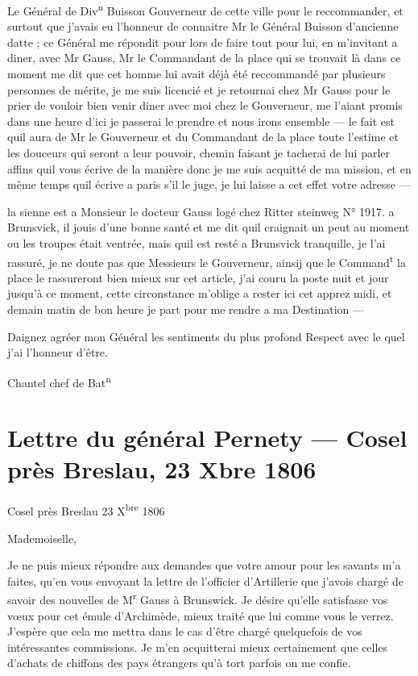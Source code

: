 \documentclass[11pt,a4paper]{article}
\begin{document}
Le Général de Div\textsuperscript{n} Buisson Gouverneur de cette ville pour le
reccommander, et surtout que j'avais eu l'honneur de connaitre Mr le Général
Buisson d'ancienne datte ; ce Général me répondit pour lors de faire tout pour
lui, en m'invitant a diner, avec Mr Gauss, Mr le Commandant de la place qui se
trouvait là dans ce moment me dit que cet homme lui avait déjà été
reccommandé par plusieurs personnes de mérite, je me suis licencié et je
retournai chez Mr Gauss pour le prier de vouloir bien venir diner avec moi chez
le Gouverneur, me l'aiant promis dans une heure d'ici je passerai le prendre et
nous irons ensemble — le fait est quil aura de Mr le Gouverneur et du
Commandant de la place toute l'estime et les douceurs qui seront a leur
pouvoir, chemin faisant je tacherai de lui parler affins quil vous écrive de la
manière donc je me suis acquitté de ma mission, et en même temps quil écrive a
paris s'il le juge, je lui laisse a cet effet votre adresse —

la sienne est a Monsieur le docteur Gauss logé chez Ritter steinweg N° 1917. a
Brunsvick, il jouis d'une bonne santé et me dit quil craignait un peut au
moment ou les troupes était ventrée, mais quil est resté a Brunsvick
tranquille, je l'ai rassuré,  je ne doute pas que Messieurs
le Gouverneur, ainsij que le Command\textsuperscript{t} la place le rassureront
bien mieux sur cet article, j'ai couru la poste nuit et jour jusqu'à ce moment,
cette circonstance m'oblige a rester ici cet apprez midi, et demain matin de
bon heure je part pour me rendre a ma Destination —

Daignez agréer mon Général les sentiments du plus profond Respect avec le quel
j'ai l'honneur d'être.

Chantel chef de Bat\textsuperscript{n}

\section{Lettre du général Pernety — Cosel près Breslau, 23 Xbre 1806}

Cosel près Breslau 23 X\textsuperscript{bre} 1806

Mademoiselle,

Je ne puis mieux répondre aux demandes que votre amour pour les savants m'a
faites, qu'en vous envoyant la lettre de l'officier d'Artillerie que j'avois
chargé de savoir des nouvelles de M\textsuperscript{r} Gauss à Brunswick. Je
désire qu'elle satisfasse vos vœux pour cet émule d'Archimède, mieux traité que
lui comme vous le verrez. J'espère que cela me mettra dans le cas d'être chargé
quelquefois de vos intéressantes commissions. Je m'en acquitterai mieux
certainement que celles d'achats de chiffons des pays étrangers qu'à tort
parfois on me confie.
\end{document}

